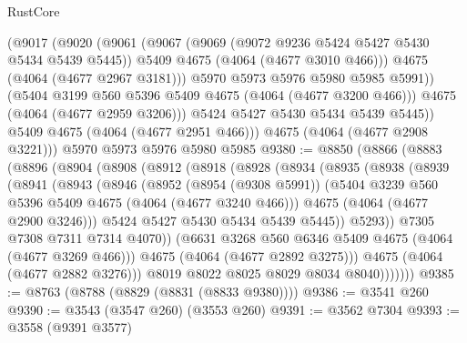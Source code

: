 \begin{lexlean}{RustCore}
\begin{coremodule}
              (@9017
                (@9020
                  (@9061
                    (@9067
                      (@9069 (@9072 @9236 @5424 @5427 @5430 @5434 @5439 @5445))
                      @5409
                      @4675
                      (@4064 (@4677 @3010 @466)))
                    @4675
                    (@4064 (@4677 @2967 @3181)))
                  @5970
                  @5973
                  @5976
                  @5980
                  @5985
                  @5991))
              (@5404 @3199 @560 @5396 @5409 @4675 (@4064 (@4677 @3200 @466)))
              @4675
              (@4064 (@4677 @2959 @3206)))
            @5424
            @5427
            @5430
            @5434
            @5439
            @5445))
        @5409
        @4675
        (@4064 (@4677 @2951 @466)))
      @4675
      (@4064 (@4677 @2908 @3221)))
    @5970
    @5973
    @5976
    @5980
    @5985
@9380 := @8850
    (@8866
      (@8883
        (@8896
          (@8904
            (@8908
              (@8912
                (@8918
                  (@8928
                    (@8934
                      (@8935
                        (@8938
                          (@8939
                            (@8941
                              (@8943
                                (@8946
                                  (@8952
                                    (@8954 (@9308 @5991))
                                    (@5404 @3239 @560 @5396 @5409 @4675 (@4064 (@4677 @3240 @466)))
                                    @4675
                                    (@4064 (@4677 @2900 @3246)))
                                  @5424
                                  @5427
                                  @5430
                                  @5434
                                  @5439
                                  @5445))
                              @5293))
                          @7305
                          @7308
                          @7311
                          @7314
                          @4070))
                      (@6631 @3268 @560 @6346 @5409 @4675 (@4064 (@4677 @3269 @466)))
                      @4675
                      (@4064 (@4677 @2892 @3275)))
                    @4675
                    (@4064 (@4677 @2882 @3276)))
                  @8019
                  @8022
                  @8025
                  @8029
                  @8034
                  @8040)))))))
@9385 := @8763 (@8788 (@8829 (@8831 (@8833 @9380))))
@9386 := @3541 @260
@9390 := @3543 (@3547 @260) (@3553 @260)
@9391 := @3562 @7304
@9393 := @3558 (@9391 @3577)

\end{coremodule}
\end{lexlean}
